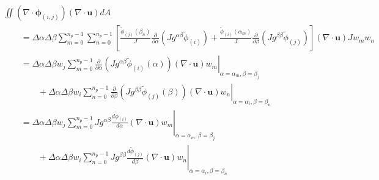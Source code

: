 \documentclass{article}
\newcommand{\vb}{\mathbf}
\newcommand{\vg}{\boldsymbol}
\newcommand{\diff}[2]{\frac{d #1}{d #2}}
\newcommand{\pdiff}[2]{\frac{\partial #1}{\partial #2}}
\begin{document}
\begin{align}
& \iint (\nabla \cdot \vg{\phi}_{(i,j)}) (\nabla \cdot \vb{u}) dA \nonumber \\
& \qquad = \Delta \alpha \Delta \beta \sum_{m=0}^{n_p-1} \sum_{n=0}^{n_p-1} \left[ \frac{\tilde{\phi}_{(j)}(\beta_n)}{J} \pdiff{}{\alpha} \left( J g^{\alpha \beta} \tilde{\phi}_{(i)} \right) + \frac{\tilde{\phi}_{(i)}(\alpha_m)}{J} \pdiff{}{\beta} \left( J g^{\beta \beta} \tilde{\phi}_{(j)} \right) \right] (\nabla \cdot \vb{u}) J w_m w_n \\
& \qquad = \Delta \alpha \Delta \beta w_j \sum_{m=0}^{n_p-1} \left. \pdiff{}{\alpha} \left( J g^{\alpha \beta} \tilde{\phi}_{(i)}(\alpha) \right) (\nabla \cdot \vb{u}) w_m \right\vert_{\alpha = \alpha_m, \beta = \beta_j} \nonumber \\
& \qquad \qquad + \Delta \alpha \Delta \beta w_i \sum_{n=0}^{n_p-1} \left. \pdiff{}{\beta} \left( J g^{\beta \beta} \tilde{\phi}_{(j)}(\beta) \right) (\nabla \cdot \vb{u}) w_n \right\vert_{\alpha = \alpha_i, \beta = \beta_n} \\
& \qquad = \Delta \alpha \Delta \beta w_j \sum_{m=0}^{n_p-1} \left. J g^{\alpha \beta} \diff{\tilde{\phi}_{(i)}}{\alpha} (\nabla \cdot \vb{u}) w_m \right\vert_{\alpha = \alpha_m, \beta = \beta_j} \nonumber \\
& \qquad \qquad + \Delta \alpha \Delta \beta w_i \sum_{n=0}^{n_p-1} \left. J g^{\beta \beta} \diff{\tilde{\phi}_{(j)}}{\beta} (\nabla \cdot \vb{u}) w_n \right\vert_{\alpha = \alpha_i, \beta = \beta_n} \label{eq:VecHyperviscosityZeroAlphaDiv}
\end{align}
\end{document}
